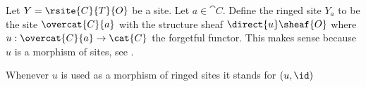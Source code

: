 \begin{definition}
Let $Y = \rsite{C}{T}{O}$ be a site.
Let $a\in \cat{C}$.
Define the ringed site $Y_a$ to be 
the site $\overcat{C}{a}$ with the structure sheaf $\direct{u}\sheaf{O}$
where $u: \overcat{C}{a} \rightarrow \cat{C}$ the forgetful functor.
This makes sense because $u$ is a morphism of sites, see .

Whenever $u$ is used as a morphism of ringed sites it stands for $(u,\id)$
\end{definition}